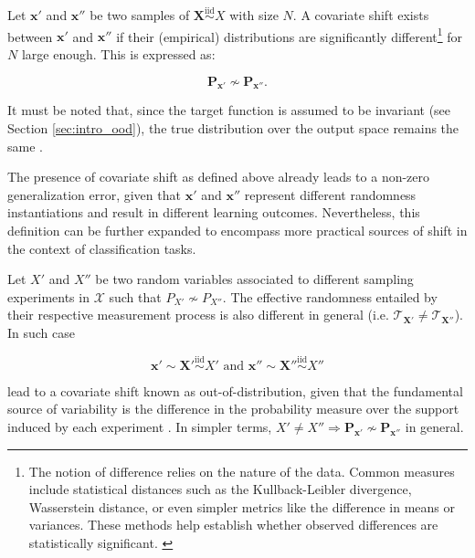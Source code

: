 \begin{definition}
    Let $\bm{x}'$ and $\bm{x}''$ be two samples of $\bm{X} \overset{\text{iid}}{\sim} X$ with size $N$.
    A covariate shift exists between $\bm{x}'$ and $\bm{x}''$ if their
    (empirical) distributions are significantly different\footnote{
        The notion of difference relies on the nature of the data. Common measures 
        include statistical distances such as the Kullback-Leibler divergence, 
        Wasserstein distance, or even simpler metrics like the difference in 
        means or variances. These methods help establish whether observed 
        differences are statistically significant. \cite{quinonero-candelaDatasetShiftMachine2009}
    }
    for $N$ large enough. This is expressed as:

    $$
    \mathbf{P}_{\bm{x}'} \not \sim \mathbf{P}_{\bm{x}''}.
    $$
    
    It must be noted that, since the target function is assumed
    to be invariant (see Section \ref{sec:intro_ood}), 
    the true distribution over the output space
    remains the same \cite{quinonero-candelaDatasetShiftMachine2009}.
\end{definition}

The presence of covariate shift as defined above already leads
to a non-zero generalization error, given that $\bm{x}'$ and $\bm{x}''$ 
represent different randomness instantiations and result in different 
learning outcomes. Nevertheless, this definition can be further
expanded to encompass more practical sources of shift in the 
context of classification tasks.

\begin{definition}\label{def:domain_shift}
    Let $X'$ and $X''$ be two random variables associated to different sampling 
    experiments in $\mathcal{X}$ such that $P_{X'} \not \sim P_{X''}$.
    The effective randomness entailed by their respective measurement
    process is also different in general (i.e. $\mathcal{T}_{\mathbf{X}'} \neq \mathcal{T}_{\mathbf{X}''}$).
    In such case

    $$
        \bm{x}' \sim \bm{X}' \overset{\text{iid}}{\sim} X' \text{ and } \bm{x}'' \sim \bm{X}'' \overset{\text{iid}}{\sim} X''
    $$

    lead to a covariate shift known as out-of-distribution, given that 
    the fundamental source of variability is the difference in the probability
    measure over the support induced by each experiment
    \cite{quinonero-candelaDatasetShiftMachine2009}.
    In simpler terms, $X' \neq X'' \Longrightarrow \mathbf{P}_{\bm{x}'} \not \sim \mathbf{P}_{\bm{x}''}$ in general.
\end{definition}

